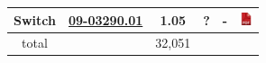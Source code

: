 \documentclass[12pt,a4paper,landscape]{article}
\begin{document}
{\begin{tabular}{|c|c|c|c|c|c|}
					Switch &
					\href{http://fr.farnell.com/eoz/09-03290-01/commutateur-a-glissiere/dp/674345}
					{09-03290.01} & 1.05 & ? &
					- &
					\href{http://www.farnell.com/datasheets/2010029.pdf}{\includegraphics[height=1em]{pdf.png}}\\
					    
					\hline
					total & & 32,051 & & &\\
					\hline
				\end{tabular}
			}
\end{document}
